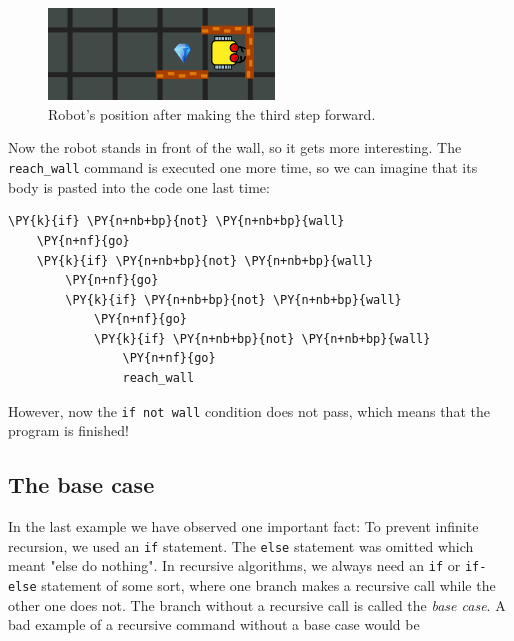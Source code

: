 \begin{figure}[!ht]
\begin{center}
\includegraphics[width=6cm]{img/rec-4.png}
\end{center}
\vspace{-4mm}
\caption{Robot's position after making the third step forward.}
\label{fig:rec4}
\end{figure}
\noindent
Now the robot stands in front of the wall, so it gets more interesting. The 
{\tt reach\_wall} command is executed one more time, so we can imagine that its body 
is pasted into the code one last time:\\

\begin{bbox}
\begin{Verbatim}[commandchars=\\\{\}]
\PY{k}{if} \PY{n+nb+bp}{not} \PY{n+nb+bp}{wall}
    \PY{n+nf}{go}
    \PY{k}{if} \PY{n+nb+bp}{not} \PY{n+nb+bp}{wall}
        \PY{n+nf}{go}
        \PY{k}{if} \PY{n+nb+bp}{not} \PY{n+nb+bp}{wall}
            \PY{n+nf}{go}
            \PY{k}{if} \PY{n+nb+bp}{not} \PY{n+nb+bp}{wall}
                \PY{n+nf}{go}
                reach_wall
\end{Verbatim}
\end{bbox}
\vspace{6mm}

\noindent
However, now the {\tt if not wall} condition does not pass, which means that  
the program is finished!

\subsection[\ \ The base case]{The base case}

In the last example we have observed one important fact: To prevent infinite recursion, we 
used an {\tt if} statement. The {\tt else} statement was omitted which meant "else do nothing".
In recursive algorithms, we always need an {\tt if} or {\tt if-else} statement of some sort, 
where one branch makes a recursive call while the other one does not. 
The branch without a recursive call is called the {\em base case}. A bad example 
of a recursive command without a base case would be\\

